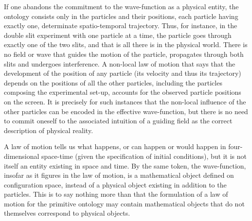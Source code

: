\documentclass[12pt,a4paper]{article}
\theoremstyle{definition}
\begin{document}
If one abandons the commitment to the wave-function as a physical entity, the ontology consists only in the particles and their positions, each particle having exactly one, determinate spatio-temporal trajectory. Thus, for instance, in the double slit experiment with one particle at a time, the particle goes through exactly one of the two slits, and that is all there is in the physical world. There is no field or wave that guides the motion of the particle, propagates through both slits and undergoes interference. A non-local law of motion that says that the development of the position of any particle (its velocity and thus its trajectory) depends on the positions of all the other particles, including the particles composing the experimental set-up, accounts for the observed particle positions on the screen. It is precisely for such instances that the non-local influence of the other particles can be encoded in the effective wave-function, but there is no need to commit oneself to the associated intuition of a guiding field as the correct description of physical reality.

A law of motion tells us what happens, or can happen or would happen in four-dimensional space-time (given the specification of initial conditions), but it is not itself an entity existing in space and time. By the same token, the wave-function, insofar as it figures in the law of motion, is a mathematical object defined on configuration space, instead of a physical object existing in addition to the particles. This is to say nothing more than that the formulation of a law of motion for the primitive ontology may contain mathematical objects that do not themselves correspond to physical objects.
\end{document}
